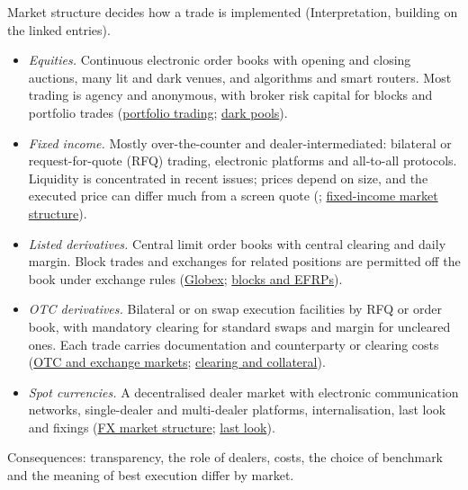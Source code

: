 \begin{qfdefinition}\label{def:trade-implementation-by-market}
 Market structure decides how a trade is implemented (Interpretation, building on the linked entries).
\begin{itemize}
\item \emph{Equities.} Continuous electronic order books with opening and closing auctions, many lit and dark venues, and algorithms and smart routers. Most trading is agency and anonymous, with broker risk capital for blocks and portfolio trades (\hyperref[def:portfolio-trading]{portfolio trading}; \hyperref[def:dark-pools-crossing]{dark pools}).
\item \emph{Fixed income.} Mostly over-the-counter and dealer-intermediated: bilateral or request-for-quote (RFQ) trading, electronic platforms and all-to-all protocols. Liquidity is concentrated in recent issues; prices depend on size, and the executed price can differ much from a screen quote (\citep[chap.~44, pp.~1097--1099]{s7-fabozzifixed}; \hyperref[def:fixed-income-market-structure]{fixed-income market structure}).
\item \emph{Listed derivatives.} Central limit order books with central clearing and daily margin. Block trades and exchanges for related positions are permitted off the book under exchange rules (\hyperref[conv:cme-globex-trading]{Globex}; \hyperref[conv:futures-block-efrp]{blocks and EFRPs}).
\item \emph{OTC derivatives.} Bilateral or on swap execution facilities by RFQ or order book, with mandatory clearing for standard swaps and margin for uncleared ones. Each trade carries documentation and counterparty or clearing costs (\hyperref[def:derivative-markets-otc-exchange]{OTC and exchange markets}; \hyperref[mech:otc-clearing-collateral]{clearing and collateral}).
\item \emph{Spot currencies.} A decentralised dealer market with electronic communication networks, single-dealer and multi-dealer platforms, internalisation, last look and fixings (\hyperref[def:fx-market-structure]{FX market structure}; \hyperref[mech:fx-last-look]{last look}).
\end{itemize}
Consequences: transparency, the role of dealers, costs, the choice of benchmark and the meaning of best execution differ by market.


\end{qfdefinition}
